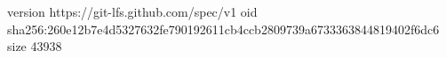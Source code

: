 version https://git-lfs.github.com/spec/v1
oid sha256:260e12b7e4d5327632fe790192611cb4ccb2809739a6733363844819402f6dc6
size 43938
